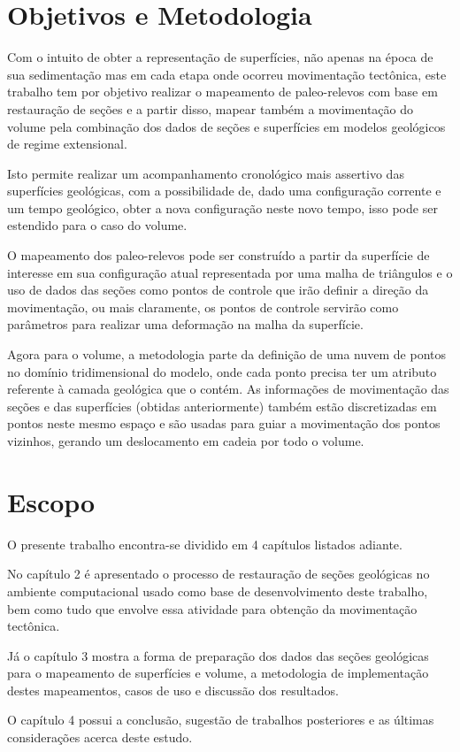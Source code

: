 \section{Objetivos e Metodologia}

Com o intuito de obter a representação de superfícies, não apenas na época de sua sedimentação mas em cada etapa onde ocorreu movimentação tectônica, este trabalho tem por objetivo realizar o mapeamento de paleo-relevos com base em restauração de seções e a partir disso, mapear também a movimentação do volume pela combinação dos dados de seções e superfícies em modelos geológicos de regime extensional.

Isto permite realizar um acompanhamento cronológico mais assertivo das superfícies geológicas, com a possibilidade de, dado uma configuração corrente e um tempo geológico, obter a nova configuração neste novo tempo, isso pode ser estendido para o caso do volume.

O mapeamento dos paleo-relevos pode ser construído a partir da superfície de interesse em sua configuração atual representada por uma malha de triângulos e o uso de dados das seções como pontos de controle que irão definir a direção da movimentação, ou mais claramente, os pontos de controle servirão como parâmetros para realizar uma deformação na malha da superfície.

Agora para o volume, a metodologia parte da definição de uma nuvem de pontos no domínio tridimensional do modelo, onde cada ponto precisa ter um atributo referente à camada geológica que o contém. As informações de movimentação das seções e das superfícies (obtidas anteriormente) também estão discretizadas em pontos neste mesmo espaço e são usadas para guiar a movimentação dos pontos vizinhos, gerando um deslocamento em cadeia por todo o volume. 

\section{Escopo}

O presente trabalho encontra-se dividido em 4 capítulos listados adiante.

No capítulo 2 é apresentado o processo de restauração de seções geológicas no ambiente computacional usado como base de desenvolvimento deste trabalho, bem como tudo que envolve essa atividade para obtenção da movimentação tectônica.

Já o capítulo 3 mostra a forma de preparação dos dados das seções geológicas para o mapeamento de superfícies e volume, a metodologia de implementação destes mapeamentos, casos de uso e discussão dos resultados.

O capítulo 4 possui a conclusão, sugestão de trabalhos posteriores e as últimas considerações acerca deste estudo.




